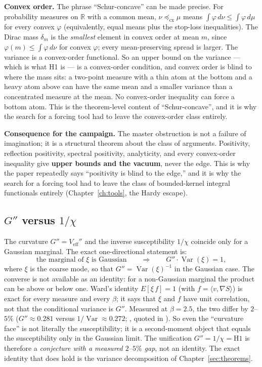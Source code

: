 \textbf{Convex order.} The phrase ``Schur-concave'' can be made precise. For probability
measures on $\mathbb R$ with a common mean, $\nu\preceq_{\mathrm{cx}}\mu$ means
$\int\varphi\,d\nu\le\int\varphi\,d\mu$ for every convex $\varphi$ (equivalently, equal means
plus the stop-loss inequalities). The Dirac mass $\delta_m$ is the \emph{smallest} element in
convex order at mean $m$, since $\varphi(m)\le\int\varphi\,d\nu$ for convex $\varphi$; every
mean-preserving spread is larger. The variance is a convex-order functional. So an upper bound on
the variance --- which is what H1 is --- is a convex-order condition, and convex order is blind to
where the mass sits: a two-point measure with a thin atom at the bottom and a heavy atom above
can have the same mean and a smaller variance than a concentrated measure at the mean. No
convex-order inequality can force a bottom atom. This is the theorem-level content of
``Schur-concave'', and it is why the search for a forcing tool had to leave the convex-order
class entirely.

\textbf{Consequence for the campaign.} The master obstruction is not a failure of imagination; it
is a structural theorem about the class of arguments. Positivity, reflection positivity, spectral
positivity, analyticity, and every convex-order inequality give \textbf{upper bounds and the
vacuum}, never the edge. This is why the paper repeatedly says ``positivity is blind to the
edge,'' and it is why the search for a forcing tool had to leave the class of bounded-kernel
integral functionals entirely (Chapter~\ref{ch:tools}, the Hardy escape).

\subsection{$G''$ versus $1/\chi$}

The curvature $G''=V_{\mathrm{eff}}''$ and the inverse susceptibility $1/\chi$ coincide only for
a Gaussian marginal. The exact one-directional statement is:
\begin{equation}
\text{the marginal of } \xi \text{ is Gaussian}
\qquad\Longrightarrow\qquad
G''\cdot\operatorname{Var}(\xi)=1 ,
\label{eq:ward}
\end{equation}
where $\xi$ is the coarse mode, so that $G''=\operatorname{Var}(\xi)^{-1}$ in the Gaussian case.
The converse is not available as an identity: for a
non-Gaussian marginal the product can be above or below one. Ward's identity $E[\xi\,f]=1$ (with
$f=\langle v,\nabla S\rangle$) is exact for every measure and every $\beta$; it says that $\xi$ and
$f$ have unit correlation, not that the conditional variance is $G''$. Measured at $\beta=2.5$,
the two differ by $2$--$5\%$ ($G''\approx0.281$ versus $1/\operatorname{Var}\approx0.272$;
, quoted in ). So even the
``curvature face'' is not literally the susceptibility; it is a second-moment object that equals
the susceptibility only in the Gaussian limit. The unification $G''=1/\chi=\text{H1}$ is therefore
a \emph{conjecture with a measured $2$--$5\%$ gap}, not an identity. The exact identity that does
hold is the variance decomposition of Chapter~\ref{sec:theorems}.

